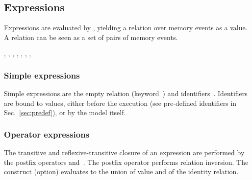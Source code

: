 \subsection{\label{language:expression}Expressions}
Expressions are evaluated by \herd, yielding a relation over memory events
as a value.
A relation can be seen as a set of pairs of memory events.
\begin{syntax}
 \is{} 
\alt {}
\alt {}\T{*} \orelse {}\T{+} \orelse {}
\orelse {}
\alt {}\T{|} \orelse
{}\T{;} \orelse
{}\T{\textbackslash} \orelse
{}\T{\&}
\alt {}\T{(}\T{)}
\alt {} \T{(}  \T{)}
\alt {} \T{(}  \T{)} \T{->} 
\alt {}  \brepet{}   \erepet{}  
\alt {}   \brepet{}   \erepet{}  
\alt \T{(}\T{)}
\sep
{} \is
{} \orelse
{} \orelse
{} \orelse
{} \orelse
{} \orelse
{} \orelse
{} \orelse
{} \orelse
{}
\alt
{} \orelse
{} \orelse
{} \orelse
{}
\sep
{} \is \epsilon
\alt {} \brepet{} \T{,}  \erepet{}
\sep
{} \is \epsilon
\alt {} \brepet{} \T{,}  \erepet{}
\sep
{} \is {} \orelse {}
\sep
{} \is {} \T{=} 
\sep
{} \is {} \T{(}  \T{)} \T{=} 
\sep
\end{syntax}

\subsubsection*{Simple expressions}
Simple expressions are the empty relation (keyword~) and
identifiers~. Identifiers are bound to values, either
before the execution (see pre-defined identifiers in Sec.~\ref{sec:predef}),
or by the model itself.

\subsubsection*{Operator expressions}
The transitive and reflexive-transitive closure of an expression are performed
by the postfix operators \T{+} and~\T{*}.
The  postfix operator  performs relation inversion.
The construct  (option) evaluates to the union
of   value and of the identity relation.

